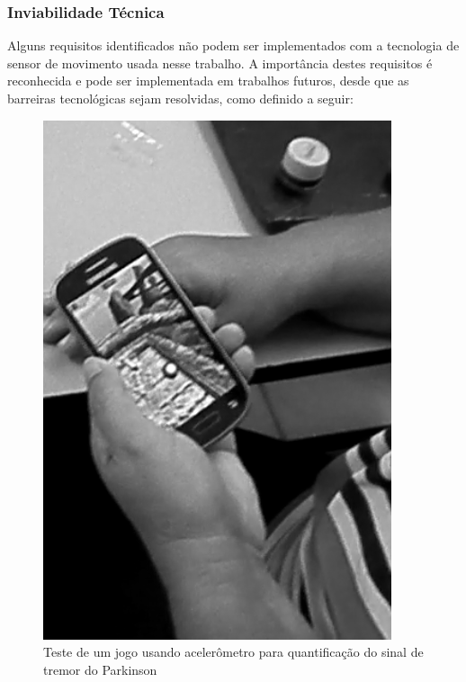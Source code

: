 \subsubsection{Inviabilidade Técnica}
Alguns requisitos identificados não podem ser implementados com a tecnologia de sensor de movimento usada nesse trabalho. A importância destes requisitos é reconhecida e pode ser implementada em trabalhos futuros, desde que as barreiras tecnológicas sejam resolvidas, como definido a seguir:

	\begin{figure}[!ht]
	\centering
	\includegraphics[scale=0.5]{./img/gametremor.png}
	\caption{Teste de um jogo usando acelerômetro para quantificação do sinal de tremor do Parkinson}
	\label{fig:gametremor}
	\end{figure}

